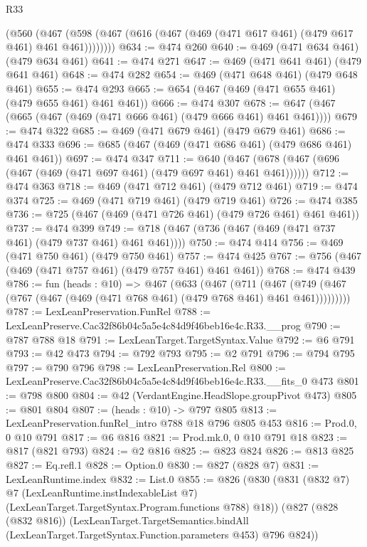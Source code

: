 \begin{lexlean}{R33}
\begin{coremodule}
      (@560 (@467 (@598 (@467 (@616 (@467 (@469 (@471 @617 @461) (@479 @617 @461) @461 @461))))))))
@634 := @474 @260
@640 := @469 (@471 @634 @461) (@479 @634 @461)
@641 := @474 @271
@647 := @469 (@471 @641 @461) (@479 @641 @461)
@648 := @474 @282
@654 := @469 (@471 @648 @461) (@479 @648 @461)
@655 := @474 @293
@665 := @654 (@467 (@469 (@471 @655 @461) (@479 @655 @461) @461 @461))
@666 := @474 @307
@678 := @647 (@467 (@665 (@467 (@469 (@471 @666 @461) (@479 @666 @461) @461 @461))))
@679 := @474 @322
@685 := @469 (@471 @679 @461) (@479 @679 @461)
@686 := @474 @333
@696 := @685 (@467 (@469 (@471 @686 @461) (@479 @686 @461) @461 @461))
@697 := @474 @347
@711 := @640 (@467 (@678 (@467 (@696 (@467 (@469 (@471 @697 @461) (@479 @697 @461) @461 @461))))))
@712 := @474 @363
@718 := @469 (@471 @712 @461) (@479 @712 @461)
@719 := @474 @374
@725 := @469 (@471 @719 @461) (@479 @719 @461)
@726 := @474 @385
@736 := @725 (@467 (@469 (@471 @726 @461) (@479 @726 @461) @461 @461))
@737 := @474 @399
@749 := @718 (@467 (@736 (@467 (@469 (@471 @737 @461) (@479 @737 @461) @461 @461))))
@750 := @474 @414
@756 := @469 (@471 @750 @461) (@479 @750 @461)
@757 := @474 @425
@767 := @756 (@467 (@469 (@471 @757 @461) (@479 @757 @461) @461 @461))
@768 := @474 @439
@786 := fun (heads : @10) =>
  @467
    (@633
      (@467
        (@711
          (@467 (@749 (@467 (@767 (@467 (@469 (@471 @768 @461) (@479 @768 @461) @461 @461)))))))))
@787 := LexLeanPreservation.FunRel
@788 := LexLeanPreserve.Cac32f86b04c5a5e4c84d9f46beb16e4c.R33.__prog
@790 := @787 @788 @18
@791 := LexLeanTarget.TargetSyntax.Value
@792 := @6 @791
@793 := @42 @473
@794 := @792 @793
@795 := @2 @791
@796 := @794 @795
@797 := @790 @796
@798 := LexLeanPreservation.Rel
@800 := LexLeanPreserve.Cac32f86b04c5a5e4c84d9f46beb16e4c.R33.__fits_0 @473
@801 := @798 @800
@804 := @42 (VerdantEngine.HeadSlope.groupPivot @473)
@805 := @801 @804
@807 := (heads : @10) -> @797 @805
@813 := LexLeanPreservation.funRel_intro @788 @18 @796 @805 @453
@816 := Prod.{0, 0} @10 @791
@817 := @6 @816
@821 := Prod.mk.{0, 0} @10 @791 @18
@823 := @817 (@821 @793)
@824 := @2 @816
@825 := @823 @824
@826 := @813 @825
@827 := Eq.refl.{1}
@828 := Option.{0}
@830 := @827 (@828 @7)
@831 := LexLeanRuntime.index
@832 := List.{0}
@855 := @826
    (@830
      (@831
        (@832 @7)
        @7
        (LexLeanRuntime.instIndexableList @7)
        (LexLeanTarget.TargetSyntax.Program.functions @788)
        @18))
    (@827
      (@828 (@832 @816))
      (LexLeanTarget.TargetSemantics.bindAll
        (LexLeanTarget.TargetSyntax.Function.parameters @453)
        @796
        @824))

\end{coremodule}
\end{lexlean}
